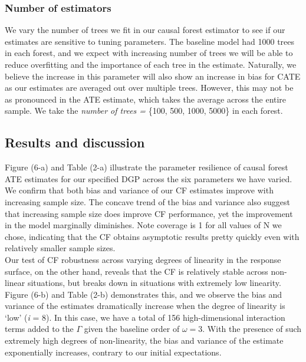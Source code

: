 \documentclass[12pt]{article}
\begin{document}
\subsubsection{Number of estimators} 
We vary the number of trees we fit in our causal forest estimator to see if our estimates are sensitive to tuning parameters. The baseline model had 1000 trees in each forest, and we expect with increasing number of trees we will be able to reduce overfitting and the importance of each tree in the estimate. Naturally, we believe the increase in this parameter will also show an increase in bias for CATE as our estimates are averaged out over multiple trees. However, this may not be as pronounced in the ATE estimate, which takes the average across the entire sample. We take the \textit{number of trees =} \{100, 500, 1000, 5000\} in each forest. 


\subsection{Results and discussion} 

Figure (6-a) and Table (2-a) illustrate the parameter resilience of causal forest ATE estimates for our specified DGP across the six parameters we have varied. We confirm that both bias and variance of our CF estimates improve with increasing sample size. The concave trend of the bias and variance also suggest that increasing sample size does improve CF performance, yet the improvement in the model marginally diminishes. Note coverage is 1 for all values of N we chose, indicating that the CF obtains asymptotic results pretty quickly even with relatively smaller sample sizes. \\ 

Our test of CF robustness across varying degrees of linearity in the response surface, on the other hand, reveals that the CF is relatively stable across non-linear situations, but breaks down in situations with extremely low linearity. Figure (6-b) and Table (2-b) demonstrates this, and we observe the bias and variance of the estimates dramatically increase when the degree of linearity is `low' (\textit{i} = 8). In this case, we have a total of 156 high-dimensional interaction terms added to the $\Gamma$ given the baseline order of $\omega = 3$.  With the presence of such extremely high degrees of non-linearity, the bias and variance of the estimate exponentially increases, contrary to our initial expectations. \\ 
\end{document}
